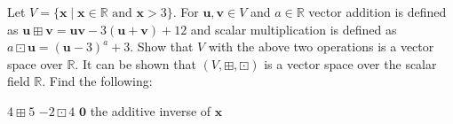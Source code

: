 
\begin{Exercise}[
name={},
title={}, 
difficulty=0,
origin={\cite{NS}}]
Let $V=\{\mathbf{x}\;|\;\mathbf{x}\in\mathbb{R}\text{ and }\mathbf{x}>3\}$.  For $\mathbf{u}, \mathbf{v}\in V$ and $a\in\mathbb{R}$ vector addition is defined as $\mathbf{u}\boxplus\mathbf{v}=\mathbf{u}\mathbf{v}-3(\mathbf{u}+\mathbf{v})+12$ and scalar multiplication is defined as $a\boxdot\mathbf{u}=(\mathbf{u}-3)^a+3$.  Show that $V$ with the above two operations is a vector space over $\mathbb{R}$. It can be shown that $(V,\boxplus,\boxdot)$ is a vector space over the scalar field $\mathbb R$. Find the following:
\begin{multicols}{2}
\Question $4\boxplus 5$
\Question $-2\boxdot 4$
\Question $\mathbf{0}$
\Question the additive inverse of $\mathbf{x}$
\EndCurrentQuestion
\end{multicols}
\end{Exercise}

\begin{Answer}
\begin{multicols}{4}
\Question 
\Question 
\Question 
\Question
\EndCurrentQuestion
\end{multicols} 
\end{Answer}
